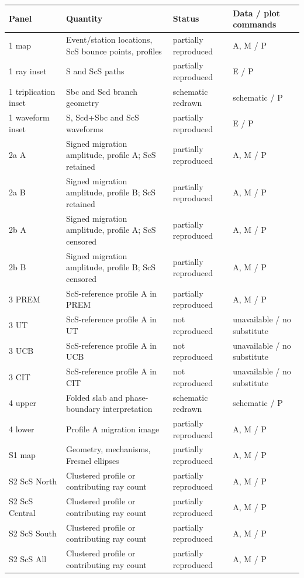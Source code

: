 \documentclass[10pt]{article}
\begin{document}
\begin{longtable}{p{.23\linewidth}p{.25\linewidth}p{.19\linewidth}p{.22\linewidth}}
\toprule Panel & Quantity & Status & Data / plot commands\\\midrule\endhead
1 map & Event/station locations, ScS bounce points, profiles & partially reproduced & A, M / P \\
1 ray inset & S and ScS paths & partially reproduced & E / P \\
1 triplication inset & Sbc and Scd branch geometry & schematic redrawn & schematic / P \\
1 waveform inset & S, Scd+Sbc and ScS waveforms & partially reproduced & E / P \\
2a A & Signed migration amplitude, profile A; ScS retained & partially reproduced & A, M / P \\
2a B & Signed migration amplitude, profile B; ScS retained & partially reproduced & A, M / P \\
2b A & Signed migration amplitude, profile A; ScS censored & partially reproduced & A, M / P \\
2b B & Signed migration amplitude, profile B; ScS censored & partially reproduced & A, M / P \\
3 PREM & ScS-reference profile A in PREM & partially reproduced & A, M / P \\
3 UT & ScS-reference profile A in UT & not reproduced & unavailable / no substitute \\
3 UCB & ScS-reference profile A in UCB & not reproduced & unavailable / no substitute \\
3 CIT & ScS-reference profile A in CIT & not reproduced & unavailable / no substitute \\
4 upper & Folded slab and phase-boundary interpretation & schematic redrawn & schematic / P \\
4 lower & Profile A migration image & partially reproduced & A, M / P \\
S1 map & Geometry, mechanisms, Fresnel ellipses & partially reproduced & A, M / P \\
S2 ScS North & Clustered profile or contributing ray count & partially reproduced & A, M / P \\
S2 ScS Central & Clustered profile or contributing ray count & partially reproduced & A, M / P \\
S2 ScS South & Clustered profile or contributing ray count & partially reproduced & A, M / P \\
S2 ScS All & Clustered profile or contributing ray count & partially reproduced & A, M / P \\

\end{longtable}
\end{document}
